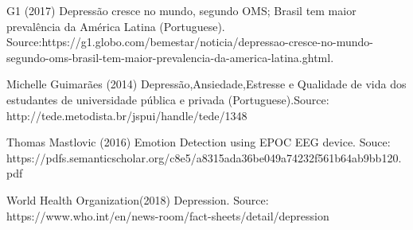 \documentclass[12pt,openright,a4paper]{article}
\begin{document}
  G1 (2017) Depressão cresce no mundo, segundo OMS; Brasil tem maior prevalência da América Latina (Portuguese). Source:https://g1.globo.com/bemestar/noticia/depressao-cresce-no-mundo-segundo-oms-brasil-tem-maior-prevalencia-da-america-latina.ghtml.\newline
  
  
  Michelle Guimarães (2014) Depressão,Ansiedade,Estresse e Qualidade de vida dos estudantes de universidade pública e privada (Portuguese).Source: http://tede.metodista.br/jspui/handle/tede/1348 \newline 
  
  Thomas Mastlovic (2016) Emotion Detection using EPOC EEG device. Souce: https://pdfs.semanticscholar.org/c8e5/a8315ada36be049a74232f561b64ab9bb120.pdf \newline
  
  World Health Organization(2018) Depression. Source: https://www.who.int/en/news-room/fact-sheets/detail/depression \newline
  
  
\end{document}
